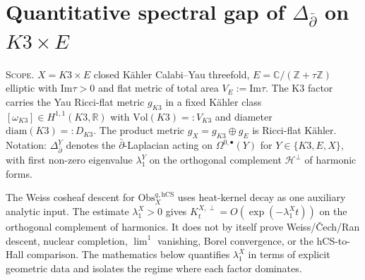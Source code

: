 \section{Quantitative spectral gap of $\Delta_{\bar\partial}$ on $K3 \times E$}
\label{wn:swarm-blocker6-v2-agent03-spectral-gap}

\providecommand{\ClaimStatusTheorem}{\textsc{[theorem]}}
\providecommand{\ClaimStatusProposition}{\textsc{[proposition]}}
\providecommand{\ClaimStatusLemma}{\textsc{[lemma]}}
\providecommand{\ClaimStatusCorollary}{\textsc{[corollary]}}
\providecommand{\ClaimStatusDefinition}{\textsc{[definition]}}
\providecommand{\ClaimStatusDerivation}{\textsc{[first-principles]}}
\providecommand{\ClaimStatusHeuristic}{\textsc{[heuristic]}}
\providecommand{\ClaimStatusOpen}{\textsc{[open]}}
\providecommand{\hCS}{\mathrm{hCS}}
\providecommand{\Vol}{\mathrm{Vol}}
\providecommand{\diam}{\mathrm{diam}}
\providecommand{\Obs}{\mathrm{Obs}}
\providecommand{\dbar}{\bar\partial}
\providecommand{\Lap}{\Delta}
\providecommand{\Im}{\mathrm{Im}}
\providecommand{\Re}{\mathrm{Re}}
\providecommand{\frakg}{\mathfrak{g}}
\providecommand{\bbR}{\mathbb{R}}
\providecommand{\bbC}{\mathbb{C}}
\providecommand{\bbZ}{\mathbb{Z}}
\providecommand{\cF}{\mathcal{F}}
\providecommand{\cH}{\mathcal{H}}
\providecommand{\cO}{\mathcal{O}}
\providecommand{\spec}{\mathrm{spec}}

\textsc{Scope.} $X = K3 \times E$ closed K\"ahler Calabi--Yau threefold,
$E = \bbC/(\bbZ + \tau\bbZ)$ elliptic with $\Im\tau > 0$ and flat metric
of total area $V_E := \Im\tau$. The K3 factor carries the Yau Ricci-flat
metric $g_{K3}$ in a fixed K\"ahler class $[\omega_{K3}] \in H^{1,1}(K3,\bbR)$
with $\Vol(K3) =: V_{K3}$ and diameter $\diam(K3) =: D_{K3}$. The product
metric $g_X = g_{K3} \oplus g_E$ is Ricci-flat K\"ahler. Notation:
$\Lap_{\dbar}^Y$ denotes the $\dbar$-Laplacian acting on $\Omega^{0,\bullet}(Y)$
for $Y \in \{K3, E, X\}$, with first non-zero eigenvalue $\lambda_1^Y$
on the orthogonal complement $\cH^\perp$ of harmonic forms.

The Weiss cosheaf descent for $\Obs^{q,\hCS}_X$ uses heat-kernel decay
as one auxiliary analytic input. The estimate
$\lambda_1^X > 0$ gives
$K_t^{X,\perp}=O(\exp(-\lambda_1^X t))$ on the orthogonal complement of
harmonics. It does not by itself prove Weiss/\v{C}ech/Ran descent,
nuclear completion, $\lim^1$ vanishing, Borel convergence, or the
hCS-to-Hall comparison. The mathematics below quantifies
$\lambda_1^X$ in terms of explicit geometric data and isolates the
regime where each factor dominates.

